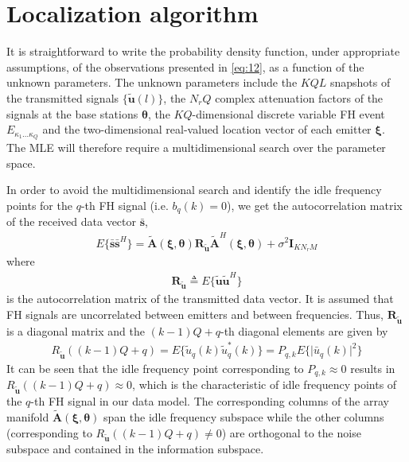 \documentclass[journal,10pt]{IEEEtran}
\begin{document}
\section{Localization algorithm}
It is straightforward to write the probability density function, under appropriate assumptions, of the observations presented in \eqref{eq:12}, as a function of the unknown parameters.
The unknown parameters include the $KQL$ snapshots of the transmitted signals $\{\tilde{\boldsymbol{u}}(l)\}$, the $N_rQ$ complex attenuation factors of the signals at the base stations $\boldsymbol{\theta}$, 
the $KQ$-dimensional discrete variable FH event $E_{\kappa_1\dots\kappa_Q}$ and the two-dimensional real-valued location vector of each emitter $\boldsymbol{\xi}$. The MLE will therefore require a multidimensional search over the parameter space.

In order to avoid the multidimensional search and identify the idle frequency points for the $q$-th FH signal (i.e. $b_q(k)=0$), we get the autocorrelation matrix of the received data vector $\bar{\boldsymbol{s}}$,
\begin{align}\label{eq:13}
    E\{\bar{\boldsymbol{s}}\bar{\boldsymbol{s}}^H\}=\tilde{\boldsymbol{A}}(\boldsymbol{\xi},\boldsymbol{\theta})\boldsymbol{R}_{\tilde{\boldsymbol{u}}}\tilde{\boldsymbol{A}}^H(\boldsymbol{\xi},\boldsymbol{\theta})+\sigma^2\boldsymbol{I}_{KN_rM}
\end{align}
where 
\begin{align}\label{eq:14}
    \boldsymbol{R}_{\tilde{\boldsymbol{u}}}\triangleq E\{\tilde{\boldsymbol{u}}\tilde{\boldsymbol{u}}^H\}
\end{align}
is the autocorrelation matrix of the transmitted data vector. It is assumed that FH signals are uncorrelated between emitters and between frequencies. 
Thus, $\boldsymbol{R}_{\tilde{\boldsymbol{u}}}$ is a diagonal matrix and the $(k-1)Q+q$-th diagonal elements are given by
\begin{align}\label{eq:15}
    R_{\tilde{\boldsymbol{u}}}((k-1)Q+q)=E\{\tilde{u}_q(k)\tilde{u}_q^\ast (k)\}=P_{q,k}E\{\vert\bar{u}_q(k)\vert^2\}
\end{align}
It can be seen that the idle frequency point corresponding to $P_{q,k}\approx 0$ results in $R_{\tilde{\boldsymbol{u}}}((k-1)Q+q)\approx 0$, which is the characteristic of idle frequency points of the $q$-th FH signal in our data model.
The corresponding columns of the array manifold $\tilde{\boldsymbol{A}}(\boldsymbol{\xi},\boldsymbol{\theta})$ span the idle frequency subspace 
while the other columns (corresponding to $R_{\tilde{\boldsymbol{u}}}((k-1)Q+q)\neq 0$) are orthogonal to the noise subspace and contained in the information subspace.
\end{document}
